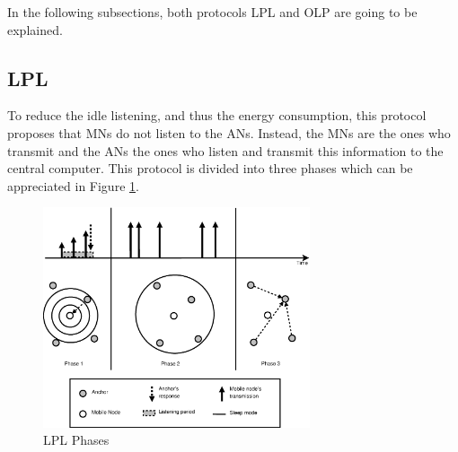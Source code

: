In the following subsections, both protocols \ac{LPL} and \ac {OLP} are going to be explained.

\subsection{\acl{LPL}}

To reduce the idle listening, and thus the energy consumption, this protocol proposes that \acp{MN} do not listen to the \acp{AN}. Instead, the
\acp{MN} are the ones who transmit and the \acp{AN} the ones who listen and transmit this information to the central computer. This protocol is 
divided into three phases which can be appreciated in Figure \ref{fig:LPL}.

\begin{figure}[ht]
 \begin{center}
  \includegraphics[width=0.7\textwidth]{LPL.eps}
 \end{center}
 \caption{LPL Phases \cite{LPLandOLP}}
 \label{fig:LPL}
\end{figure}

